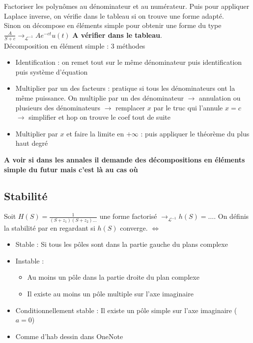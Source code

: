 \documentclass{article}
\theoremstyle{plain}%
\theoremstyle{definition}
\theoremstyle{remark}
\begin{document}
Factoriser les polynômes au dénominateur et au numérateur. Puis pour appliquer Laplace inverse, on vérifie dans le tableau si on trouve une forme adapté. \\
Sinon on décompose en éléments simple pour obtenir une forme du type $ \frac{A}{S+c} \to _{\mathcal{L}^{-1}} A e^{-ct}u(t)$ \textbf{A vérifier dans le tableau}.\\
Décomposition en élément simple : 3 méthodes \begin{itemize}
    \item Identification : on remet tout sur le même dénominateur puis identification puis système d'équation
    \item Multiplier par un des facteurs : pratique si tous les dénominateurs ont la même puissance. On multiplie par un des dénominateur $\rightarrow$ annulation ou plusieurs des dénominateurs $\rightarrow$ remplacer $ x $ par le truc qui l'annule $ x=c $ $\rightarrow$ simplifier et hop on trouve le coef tout de suite
    \item Multiplier par $ x $  et faire la limite en $ +\infty  $  : puis appliquer le théorème du plus haut degré
\end{itemize}
\textbf{A voir si dans les annales il demande des décompositions en éléments simple du futur mais c'est là au cas où}

\subsection{Stabilité}
Soit $ H(S) = \frac{1}{(S+z_1)(S+z_2)\dots} $ une forme factorisé $ \to_{\mathcal{L}^{-1}} h(S)=\dots$. On définis la stabilité par en regardant si $ h(S) $ converge. $ \Leftrightarrow $ \begin{itemize}
    \item Stable : Si tous les pôles sont dans la partie gauche du plans complexe
    \item Instable : \begin{itemize}
        \item Au moins un pôle dans la partie droite du plan complexe
        \item Il existe au moins un pôle multiple sur l'axe imaginaire
    \end{itemize}
    \item Conditionnellement stable : Il existe un pôle simple sur l'axe imaginaire ($a=0$)
    \item Comme d'hab dessin dans OneNote
\end{itemize}
\end{document}
